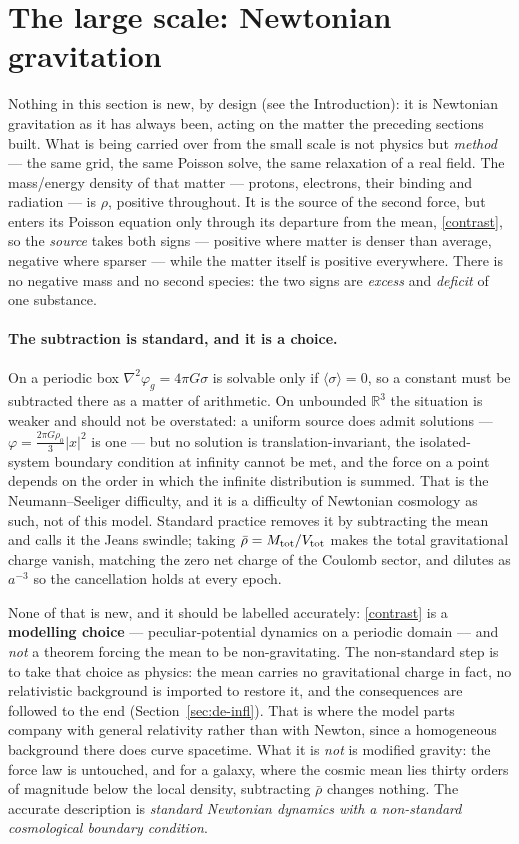 \documentclass[11pt]{article}
\newcommand{\grad}{\nabla}
\begin{document}
\section{The large scale: Newtonian gravitation}\label{sec:large}
Nothing in this section is new, by design (see the Introduction): it is Newtonian gravitation as it has always
been, acting on the matter the preceding sections built. What is being carried over from the small scale is not
physics but \emph{method} --- the same grid, the same Poisson solve, the same relaxation of a real field. The mass/energy density of that matter --- protons,
electrons, their binding and radiation --- is $\rho$, positive throughout. It is the source of the second force, but enters its Poisson equation only through its departure from
the mean, \eqref{contrast}, so the \emph{source} takes both signs --- positive where matter is denser than average,
negative where sparser --- while the matter itself is positive everywhere. There is no negative mass and no second
species: the two signs are \emph{excess} and \emph{deficit} of one substance.

\paragraph{The subtraction is standard, and it is a choice.} On a periodic box $\grad^2\varphi_g=4\pi G\sigma$
is solvable only if $\langle\sigma\rangle=0$, so a constant must be subtracted there as a matter of arithmetic.
On unbounded $\mathbb{R}^3$ the situation is weaker and should not be overstated: a uniform source does admit
solutions --- $\varphi=\tfrac{2\pi G\rho_0}{3}|x|^2$ is one --- but no solution is translation-invariant, the
isolated-system boundary condition at infinity cannot be met, and the force on a point depends on the order in
which the infinite distribution is summed. That is the Neumann--Seeliger difficulty, and it is a difficulty of
Newtonian cosmology as such, not of this model. Standard practice removes it by subtracting the mean and calls it
the Jeans swindle; taking $\bar\rho=M_{\rm tot}/V_{\rm tot}$ makes the total gravitational charge vanish,
matching the zero net charge of the Coulomb sector, and dilutes as $a^{-3}$ so the cancellation holds at every
epoch.

None of that is new, and it should be labelled accurately: \eqref{contrast} is a \textbf{modelling choice} ---
peculiar-potential dynamics on a periodic domain --- and \emph{not} a theorem forcing the mean to be
non-gravitating. The non-standard step is to take that choice as physics: the mean carries no gravitational charge
in fact, no relativistic background is imported to restore it, and the consequences are followed to the end
(Section~\ref{sec:de-infl}). That is where the model parts company with general relativity rather than with
Newton, since a homogeneous background there does curve spacetime. What it is \emph{not} is modified gravity: the
force law is untouched, and for a galaxy, where the cosmic mean lies thirty orders of magnitude below the local
density, subtracting $\bar\rho$ changes nothing. The accurate description is \emph{standard Newtonian dynamics
with a non-standard cosmological boundary condition}.
\end{document}
